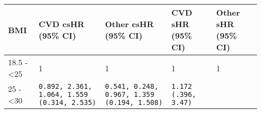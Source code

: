 \documentclass[]{article}
\begin{document}
\begin{longtable}[]{@{}lllll@{}}
\toprule
\begin{minipage}[b]{0.09\columnwidth}\raggedright\strut
BMI\strut
\end{minipage} & \begin{minipage}[b]{0.16\columnwidth}\raggedright\strut
CVD csHR (95\% CI)\strut
\end{minipage} & \begin{minipage}[b]{0.16\columnwidth}\raggedright\strut
Other csHR (95\% CI)\strut
\end{minipage} & \begin{minipage}[b]{0.23\columnwidth}\raggedright\strut
CVD sHR (95\% CI)\strut
\end{minipage} & \begin{minipage}[b]{0.23\columnwidth}\raggedright\strut
Other sHR (95\% CI)\strut
\end{minipage}\tabularnewline
\midrule
\endhead
\begin{minipage}[t]{0.09\columnwidth}\raggedright\strut
18.5 - \textless{}25\strut
\end{minipage} & \begin{minipage}[t]{0.16\columnwidth}\raggedright\strut
1\strut
\end{minipage} & \begin{minipage}[t]{0.16\columnwidth}\raggedright\strut
1\strut
\end{minipage} & \begin{minipage}[t]{0.23\columnwidth}\raggedright\strut
1\strut
\end{minipage} & \begin{minipage}[t]{0.23\columnwidth}\raggedright\strut
1\strut
\end{minipage}\tabularnewline
\begin{minipage}[t]{0.09\columnwidth}\raggedright\strut
25 - \textless{}30\strut
\end{minipage} & \begin{minipage}[t]{0.16\columnwidth}\raggedright\strut
\tt{0.892, 2.361, 1.064, 1.559} (\tt{0.314}, \tt{2.535})\strut
\end{minipage} & \begin{minipage}[t]{0.16\columnwidth}\raggedright\strut
\tt{0.541, 0.248, 0.967, 1.359} (\tt{0.194}, \tt{1.508})\strut
\end{minipage} & \begin{minipage}[t]{0.23\columnwidth}\raggedright\strut
\tt{1.172} (.396, 3.47)\strut
\end{minipage} & \begin{minipage}[t]{0.23\columnwidth}\raggedright\strut

\end{minipage}
\end{longtable}
\end{document}
